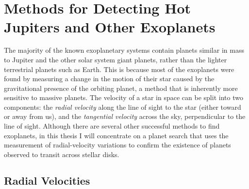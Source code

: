 \section{Methods for Detecting Hot Jupiters and Other Exoplanets}
\label{cha:intro:sec:methods}

The majority of the known exoplanetary systems contain planets similar in mass to Jupiter and the other solar system giant planets, rather than the lighter terrestrial planets such as Earth. 
This is because most of the exoplanets were found by measuring a change in the motion of their star caused by the gravitational presence of the orbiting planet, a method that is inherently more sensitive to massive planets.
The velocity of a star in space can be split into two components: the {\it radial velocity} along the line of sight to the star (either toward or away from us), and the {\it tangential velocity} across the sky, perpendicular to the line of sight. 
Although there are several other successful methods to find exoplanets, in this thesis I will concentrate on a planet search that uses the measurement of radial-velocity variations to confirm the existence of planets observed to transit across stellar disks.
	
\subsection{Radial Velocities}
\label{cha:intro:sec:methods:sub:rv}

